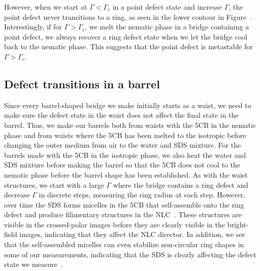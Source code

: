 However, when we start at $\Gamma < \Gamma_c$ in a point defect state and increase $\Gamma$, the point defect never transitions to a ring, as seen in the lower contour in Figure~.
Interestingly, if for $\Gamma > \Gamma_c$, we melt the nematic phase in a bridge containing a point defect, we always  recover a ring defect state when we let the bridge cool back to the nematic phase.
This suggests that the point defect is metastable for $\Gamma > \Gamma_c$.


\subsection{Defect transitions in a barrel}
Since every barrel-shaped bridge we make initially starts as a waist, we need to make sure the defect state in the waist does not affect the final state in the barrel.
Thus, we make our barrels both from waists with the 5CB in the nematic phase and from waists where the 5CB has been melted to the isotropic before changing the outer medium from air to the water and SDS mixture.
For the barrels made with the 5CB in the isotropic phase, we also heat the water and SDS mixture before making the barrel so that the 5CB does not cool to the nematic phase before the barrel shape has been established.
As with the waist structures, we start with a large $\Gamma$ where the bridge contains a ring defect and decrease $\Gamma$ in discrete steps, measuring the ring radius at each step.
However, over time the SDS forms micelles in the 5CB that self-assemble onto the ring defect and produce filimentary structures in the NLC~\cite{RN279}.
These structures are visible in the crossed-polar images before they are clearly visible in the bright-field images, indicating that they affect the NLC director.
In addition, we see that the self-assembled micelles can even stabilize non-circular ring shapes in some of our measurements, indicating that the SDS is clearly affecting the defect state we measure~\cite{RN279,RN280}.

